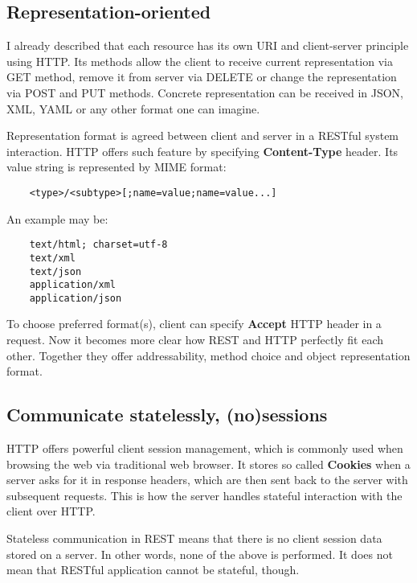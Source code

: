 	\subsection{Representation-oriented}
	
	I already described that each resource has its own URI and client-server principle using HTTP. Its methods allow the
	client to receive current representation via GET method, remove it from server via DELETE or change the representation
	via POST and PUT methods. Concrete representation can be received in JSON, XML, YAML or any other format one can
	imagine.
	
	Representation format is agreed between client and server in a RESTful system interaction. HTTP offers such feature
	by specifying \textbf{Content-Type} header. Its value string is represented by \gls{MIME} format:
	
	\begin{verbatim}
	<type>/<subtype>[;name=value;name=value...]
	\end{verbatim}
	
	An example may be:
	
	\begin{verbatim}
	text/html; charset=utf-8
	text/xml
	text/json
	application/xml
	application/json
	\end{verbatim}
	
	To choose preferred format(s), client can specify \textbf{Accept} HTTP header in a request. Now it becomes more clear
	how REST and HTTP perfectly fit each other. Together they offer addressability, method choice and object representation
	format.
	
	\subsection{Communicate statelessly, (no)sessions}
	
	HTTP offers powerful client session management, which is commonly used when browsing the web via traditional web
	browser. It stores so called \textbf{Cookies} when a server asks for it in response headers, which are then sent back
	to the server with subsequent requests. This is how the server handles stateful interaction with the client over HTTP.
	
	Stateless communication in REST means that there is no client session data stored on a server. In other words, none of
	the above is performed. It does not mean that RESTful application cannot be stateful, though.
	
